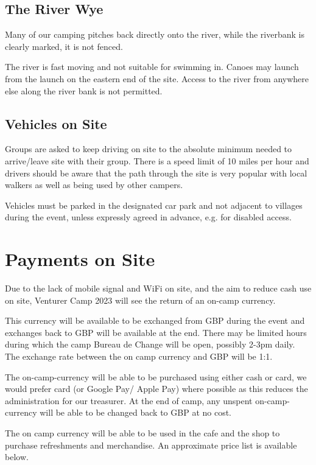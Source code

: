 \documentclass[a4paper, 11pt]{report}
\newcommand{\nl}{\newline}
\begin{document}
\section{The River Wye}
Many of our camping pitches back directly onto the river, while the riverbank is clearly marked, it is not fenced. \nl

The river is fast moving and not suitable for swimming in. Canoes may launch from the launch on the eastern end of the site. Access to the river from anywhere else along the river bank is not permitted. 

\section{Vehicles on Site}
Groups are asked to keep driving on site to the absolute minimum needed to arrive/leave site with their group.  There is a speed limit of 10 miles per hour and drivers should be aware that the path through the site is very popular with local walkers as well as being used by other campers.\nl

Vehicles must be parked in the designated car park and not adjacent to villages during the event, unless expressly agreed in advance, e.g. for disabled access.

\chapter{Payments on Site}
Due to the lack of mobile signal and WiFi on site, and the aim to reduce cash use on site, Venturer Camp 2023 will see the return of an on-camp currency.\nl

This currency will be available to be exchanged from GBP during the event and exchanges back to GBP will be available at the end. There may be limited hours during which the camp Bureau de Change will be open, possibly 2-3pm daily. The exchange rate between the on camp currency and GBP will be 1:1. \nl

The on-camp-currency will be able to be purchased using either cash or card, we would prefer card (or Google Pay/ Apple Pay) where possible as this reduces the administration for our treasurer. At the end of camp, any unspent on-camp-currency will be able to be changed back to GBP at no cost. 

The on camp currency will be able to be used in the cafe and the shop to purchase refreshments and merchandise. An approximate price list is available below.
\end{document}
